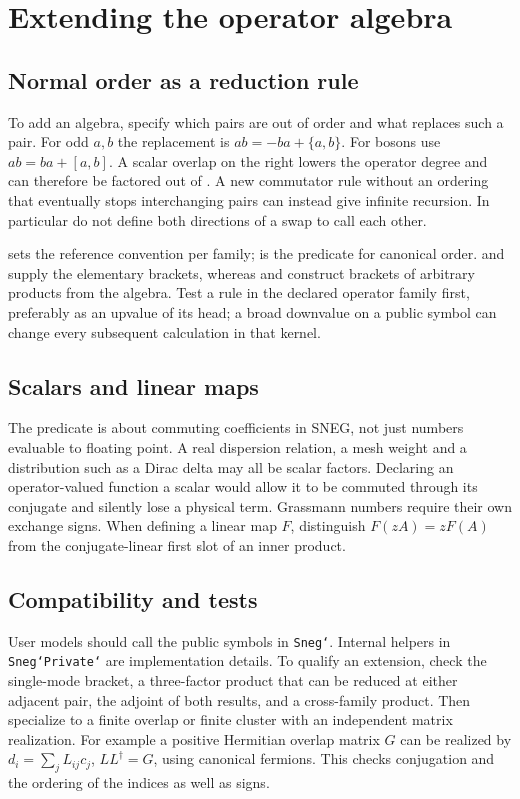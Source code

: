\chapter{Extending the operator algebra}
\section{Normal order as a reduction rule}
To add an algebra, specify which pairs are out of order and what
replaces such a pair. For odd $a,b$ the replacement is $ab=-ba+\{a,b\}$.
For bosons use $ab=ba+[a,b]$. A scalar overlap on the right lowers
the operator degree and can therefore be factored out of .
A new commutator rule without an ordering that eventually stops
interchanging pairs can instead give infinite recursion. In particular
do not define both directions of a swap to call each other.

 sets the reference convention per family;
 is the predicate for canonical order.
 and  supply the elementary brackets, whereas
 and  construct brackets of arbitrary
products from the algebra. Test a rule in the declared operator family
first, preferably as an upvalue of its head; a broad downvalue on a
public symbol can change every subsequent calculation in that kernel.

\section{Scalars and linear maps}
The predicate  is about commuting coefficients in
SNEG, not just numbers evaluable to floating point. A real dispersion
relation, a mesh weight and a distribution such as a Dirac delta
may all be scalar factors. Declaring an operator-valued function a
scalar would allow it to be commuted through its conjugate and
silently lose a physical term. Grassmann numbers require their own
exchange signs. When defining a linear map $F$, distinguish
$F(zA)=zF(A)$ from the conjugate-linear first slot of an inner product.

\section{Compatibility and tests}
User models should call the public symbols in \texttt{Sneg`}.
Internal helpers in \texttt{Sneg`Private`} are implementation details.
To qualify an extension, check the single-mode bracket, a three-factor
product that can be reduced at either adjacent pair, the adjoint of
both results, and a cross-family product. Then specialize to a finite
overlap or finite cluster with an independent matrix realization.
For example a positive Hermitian overlap matrix $G$ can be realized by
$d_i=\sum_j L_{ij}c_j$, $LL^\dagger=G$, using canonical fermions.
This checks conjugation and the ordering of the indices as well as signs.

